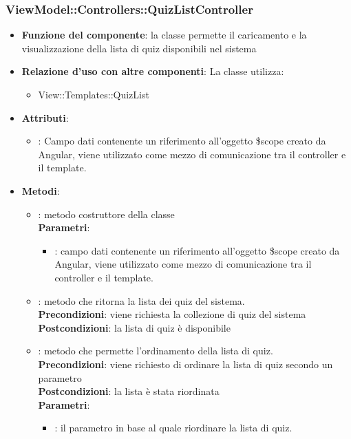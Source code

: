 \subsubsection{ViewModel::Controllers::QuizListController}
\begin{itemize}
\item\textbf{Funzione del componente}:  la classe permette il caricamento e la visualizzazione della lista di quiz disponibili nel sistema
	\item\textbf{Relazione d'uso con altre componenti}:
La classe utilizza:
	\begin{itemize}
		\item View::Templates::QuizList
	\end{itemize}
\item\textbf{Attributi}:
	\begin{itemize}
		\item{}: Campo dati contenente un riferimento all’oggetto \$scope creato da Angular, viene utilizzato come mezzo di comunicazione tra il controller e il template.\\
	\end{itemize}
\item\textbf{Metodi}:
	\begin{itemize}
		\item{}: metodo costruttore della classe\\
		\textbf{Parametri}:
			\begin{itemize}
				\item{}: campo dati contenente un riferimento all’oggetto \$scope creato da Angular, viene utilizzato come mezzo di comunicazione tra il controller e il template.\\
			\end{itemize}
		\item{}: metodo che ritorna la lista dei quiz del sistema.\\		
		\textbf{Precondizioni}: viene richiesta la collezione di quiz del sistema\\
		\textbf{Postcondizioni}: la lista di quiz è disponibile\\
		\item{}: metodo che permette l'ordinamento della lista di quiz.\\
		\textbf{Precondizioni}: viene richiesto di ordinare la lista di quiz secondo un parametro\\
		\textbf{Postcondizioni}: la lista è stata riordinata\\
		\textbf{Parametri}:
			\begin{itemize}
				\item{}: il parametro in base al quale riordinare la lista di quiz.\\
			\end{itemize}
	\end{itemize}
\end{itemize}

